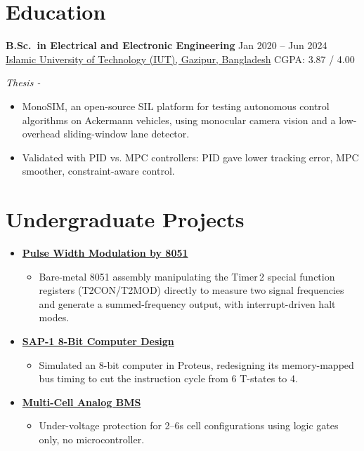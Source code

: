 \documentclass[10pt]{article}
\begin{document}
\section*{Education}
\textbf{B.Sc.\ in Electrical and Electronic Engineering} \hfill Jan 2020 -- Jun 2024\\
\href{https://www.iutoic-dhaka.edu/}{Islamic University of Technology (IUT), Gazipur, Bangladesh}
\hfill CGPA: 3.87 / 4.00

\smallskip
\textit{Thesis -}
\begin{itemize}
    \item MonoSIM, an open-source SIL platform for testing autonomous control algorithms on
    Ackermann vehicles, using monocular camera vision and a low-overhead sliding-window lane
    detector.
    \item Validated with PID vs. MPC controllers: PID gave lower tracking error, MPC smoother,
    constraint-aware control.
\end{itemize}

\section*{Undergraduate Projects}
\begin{itemize}[label={}, leftmargin=0pt, itemsep=4pt]

    \item \textbf{\href{https://www.youtube.com/watch?v=YBWyxpcqqeg}{Pulse Width Modulation by
    8051}}
    \begin{itemize}
        \item Bare-metal 8051 assembly manipulating the Timer\,2 special function registers
        (T2CON/T2MOD) directly to measure two signal frequencies and generate a summed-frequency
        output, with interrupt-driven halt modes.
    \end{itemize}

    \item \textbf{\href{https://github.com/Mainul-Islam-07/SAP-1-8-Bit-Computer-Design}{SAP-1
    8-Bit Computer Design}}
    \begin{itemize}
        \item Simulated an 8-bit computer in Proteus, redesigning its memory-mapped bus timing to
        cut the instruction cycle from 6 T-states to 4.
    \end{itemize}

    \item \textbf{\href{https://mainul-islam-07.github.io/mainulislam.github.io/assets/projects/project.html?i=10}{Multi-Cell
    Analog BMS}}
    \begin{itemize}
        \item Under-voltage protection for 2--6s cell configurations using logic gates only, no
        microcontroller.
    \end{itemize}

\end{itemize}
\end{document}
